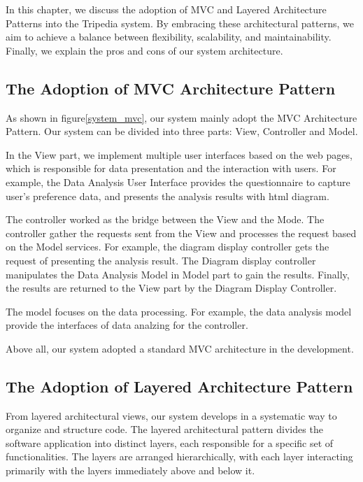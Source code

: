 \documentclass[conference]{IEEEtran}
\begin{document}
In this chapter, we discuss the adoption of MVC and Layered Architecture Patterns into the Tripedia system. By embracing these architectural patterns, we aim to achieve a balance between flexibility, scalability, and maintainability. Finally, we explain the pros and cons of our system architecture.


\subsection{\textbf{The Adoption of MVC Architecture Pattern}}

As shown in figure\ref{system_mvc}, our system mainly adopt the MVC Architecture Pattern. Our system can be divided into three parts: View, Controller and Model.

In the View part, we implement multiple user interfaces based on the web pages, which is responsible for data presentation and the interaction with users. For example, the Data Analysis User Interface provides the questionnaire to capture user's preference data, and presents the analysis results with html diagram.

The controller worked as the bridge between the View and the Mode. The controller gather the requests sent from the View and processes the request based on the Model services. For example, the diagram display controller gets the request of presenting the analysis result. The Diagram display controller manipulates the Data Analysis Model in Model part to gain the results. Finally, the results are returned to the View part by the Diagram Display Controller.

The model focuses on the data processing. For example, the data analysis model provide the interfaces of data analzing for the controller. 

Above all, our system adopted a standard MVC architecture in the development.

\subsection{\textbf{The Adoption of Layered Architecture Pattern}}

From layered architectural views, our system develops in a systematic way to organize and structure code. The layered architectural pattern divides the software application into distinct layers, each responsible for a specific set of functionalities. The layers are arranged hierarchically, with each layer interacting primarily with the layers immediately above and below it. 
\end{document}
